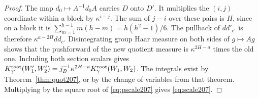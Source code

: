 \documentclass[a4paper,11pt]{article}
\theoremstyle{definition}
\theoremstyle{remark}
\numberwithin{equation}{section}
\begin{document}
\begin{proof}
The map \(d_0\mapsto A^{-1}d_0 A\) carries \(D\) onto \(D'\).
It multiplies the \((i,j)\) coordinate within a block by
\(\kappa^{i-j}\). The sum of \(j-i\) over these pairs is
\(H\), since on a block it is
\(\sum_{m=1}^{h-1}m(h-m)=h(h^2-1)/6\).
The pullback of \(dd'_{c'}\) is therefore
\(\kappa^{a-2H}dd_c\). Disintegrating group Haar measure on
both sides of \(g\mapsto Ag\) shows that the pushforward
of the new quotient measure is \(\kappa^{2H-a}\) times the old
one. Including both section scalars gives
\(K_{\gamma'}^{\rm root}(W'_1,W'_2)
 =j_B^{-1}\kappa^{2H-a}K_\gamma^{\rm root}(W_1,W_2)\).
The integrals exist by Theorem~\ref{thm:quot207}, or by the
change of variables from that theorem. Multiplying by the square
root of \eqref{eq:pscale207} gives \eqref{eq:scale207}.
\end{proof}
\end{document}
